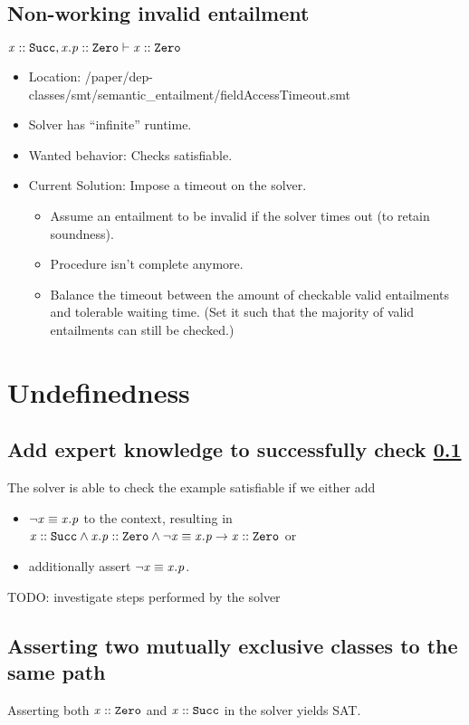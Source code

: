 \documentclass[a4paper]{article}
\begin{document}
\subsection{Non-working invalid entailment}
\label{example:field-access-timeout}
$\mathit{x} :: \mathit{\mathtt{Succ}}, \mathit{x.p} :: \mathit{\mathtt{Zero}} \vdash \mathit{x} :: \mathit{\mathtt{Zero}}$
\begin{itemize}
  \item Location: /paper/dep-classes/smt/semantic_entailment/fieldAccessTimeout.smt
  \item Solver has ``infinite'' runtime.
  \item Wanted behavior: Checks satisfiable.
  \item Current Solution: Impose a timeout on the solver.
  \begin{itemize}
    \item Assume an entailment to be invalid if the solver times out (to retain soundness).
    \item Procedure isn't complete anymore.
    \item Balance the timeout between the amount of checkable valid entailments and tolerable waiting time.
    (Set it such that the majority of valid entailments can still be checked.)
  \end{itemize}
\end{itemize}

\section{Undefinedness}
\subsection{Add expert knowledge to successfully check \ref{example:field-access-timeout}}
The solver is able to check the example satisfiable if we either add
\begin{itemize}
  \item $\neg \mathit{x} \equiv \mathit{x.p}$ to the context, resulting in ${\mathit{x} :: \mathit{\mathtt{Succ}} \land \mathit{x.p} :: \mathit{\mathtt{Zero}} \land \neg \mathit{x} \equiv \mathit{x.p}} \rightarrow {\ensuremath{\mathit{x} :: \mathit{\mathtt{Zero}}}}$ or
  \item additionally assert $\neg \mathit{x} \equiv \mathit{x.p}$.
\end{itemize}
TODO: investigate steps performed by the solver

\subsection{Asserting two mutually exclusive classes to the same path}
\label{section:mutually-exclusive-classes}
Asserting both $\mathit{x} :: \mathit{\mathtt{Zero}}$ and $\mathit{x} :: \mathit{\mathtt{Succ}}$ in the solver yields SAT.
\end{document}
